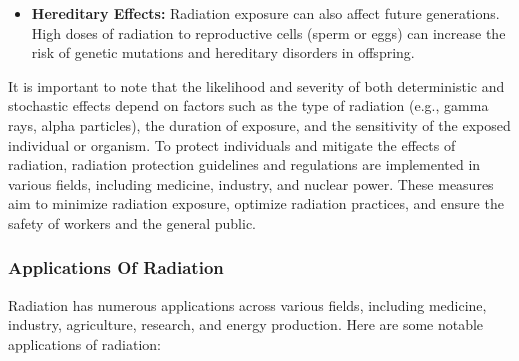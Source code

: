 \documentclass[../../Report.tex]{subfiles}
\begin{document}
\begin{enumerate}
\begin{itemize}
                \item \textbf{Hereditary Effects:} Radiation exposure can also affect future generations. High doses of radiation to 
                reproductive cells (sperm or eggs) can increase the risk of genetic mutations and hereditary disorders in offspring.

            \end{itemize}
        \end{enumerate}

        It is important to note that the likelihood and severity of both deterministic and stochastic effects depend on factors such as the 
        type of radiation (e.g., gamma rays, alpha particles), the duration of exposure, and the sensitivity of the exposed individual or organism.
        To protect individuals and mitigate the effects of radiation, radiation protection guidelines and regulations are implemented 
        in various fields, including medicine, industry, and nuclear power. These measures aim to minimize radiation exposure, optimize radiation 
        practices, and ensure the safety of workers and the general public.

    \subsubsection*{\large Applications Of Radiation}
        Radiation has numerous applications across various fields, including medicine, industry, agriculture, research, and energy production. 
        Here are some notable applications of radiation:
        
\end{document}
